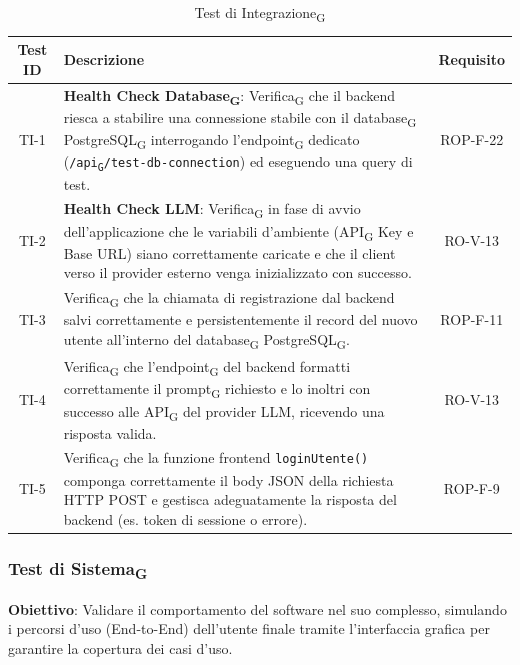 \documentclass[11pt,a4paper]{article}
\newcommand{\gls}[1]{#1\textsubscript{G}}
\begin{document}
\begin{table}[H]
    \centering
    \small
    \begin{tabularx}{\textwidth}{|c|X|c|}
        \hline
        \textbf{Test ID} & \textbf{Descrizione} & \textbf{Requisito} \\
        \hline
        TI-1 & \textbf{Health Check \gls{Database}}: \gls{Verifica} che il backend riesca a stabilire una connessione stabile con il \gls{database} \gls{PostgreSQL} interrogando l'\gls{endpoint} dedicato (\texttt{/\gls{api}/test-db-connection}) ed eseguendo una query di test. & ROP-F-22 \\
        \hline
        TI-2 & \textbf{Health Check LLM}: \gls{Verifica} in fase di avvio dell'applicazione che le variabili d'ambiente (\gls{API} Key e Base URL) siano correttamente caricate e che il client verso il provider esterno venga inizializzato con successo. & RO-V-13 \\
        \hline
        TI-3 & \gls{Verifica} che la chiamata di registrazione dal backend salvi correttamente e persistentemente il record del nuovo utente all'interno del \gls{database} \gls{PostgreSQL}. & ROP-F-11 \\
        \hline
        TI-4 & \gls{Verifica} che l'\gls{endpoint} del backend formatti correttamente il \gls{prompt} richiesto e lo inoltri con successo alle \gls{API} del provider LLM, ricevendo una risposta valida. & RO-V-13 \\
        \hline
        TI-5 & \gls{Verifica} che la funzione frontend \texttt{loginUtente()} componga correttamente il body JSON della richiesta HTTP POST e gestisca adeguatamente la risposta del backend (es. token di sessione o errore). & ROP-F-9 \\
        \hline
    \end{tabularx}
    \caption{\gls{Test di Integrazione}}
\end{table}

\subsubsection{\gls{Test di Sistema}}
\textbf{Obiettivo}: Validare il comportamento del software nel suo complesso, simulando i percorsi d'uso (End-to-End) dell'utente finale tramite l'interfaccia grafica per garantire la copertura dei casi d'uso.
\end{document}

